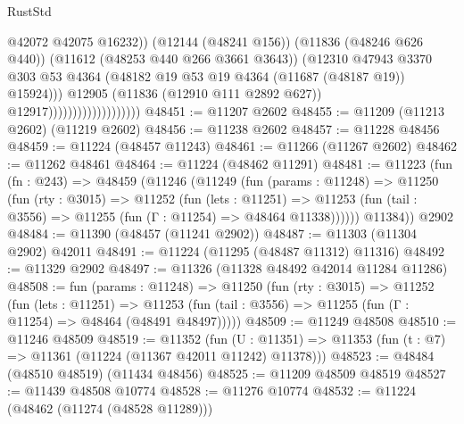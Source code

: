 \begin{lexlean}{RustStd}
\begin{coremodule}
                                                @42072
                                                @42075
                                                @16232))
                                            (@12144 (@48241 @156))
                                            (@11836 (@48246 @626 @440))
                                            (@11612 (@48253 @440 @266 @3661 @3643))
                                            (@12310
                                              @47943
                                              @3370
                                              @303
                                              @53
                                              @4364
                                              (@48182
                                                @19
                                                @53
                                                @19
                                                @4364
                                                (@11687 (@48187 @19))
                                                @15924)))
                                          @12905
                                          (@11836 (@12910 @111 @2892 @627))
                                          @12917)))))))))))))))))))
@48451 := @11207 @2602
@48455 := @11209 (@11213 @2602) (@11219 @2602)
@48456 := @11238 @2602
@48457 := @11228 @48456
@48459 := @11224 (@48457 @11243)
@48461 := @11266 (@11267 @2602)
@48462 := @11262 @48461
@48464 := @11224 (@48462 @11291)
@48481 := @11223
    (fun (fn : @243) =>
    @48459
      (@11246
        (@11249
          (fun (params : @11248) =>
          @11250
            (fun (rty : @3015) =>
            @11252
              (fun (lets : @11251) =>
              @11253 (fun (tail : @3556) => @11255 (fun (Γ : @11254) => @48464 @11338))))))
        @11384))
    @2902
@48484 := @11390 (@48457 (@11241 @2902))
@48487 := @11303 (@11304 @2902) @42011
@48491 := @11224 (@11295 (@48487 @11312) @11316)
@48492 := @11329 @2902
@48497 := @11326 (@11328 @48492 @42014 @11284 @11286)
@48508 := fun (params : @11248) =>
  @11250
    (fun (rty : @3015) =>
    @11252
      (fun (lets : @11251) =>
      @11253 (fun (tail : @3556) => @11255 (fun (Γ : @11254) => @48464 (@48491 @48497)))))
@48509 := @11249 @48508
@48510 := @11246 @48509
@48519 := @11352
    (fun (U : @11351) => @11353 (fun (t : @7) => @11361 (@11224 (@11367 @42011 @11242) @11378)))
@48523 := @48484 (@48510 @48519) (@11434 @48456)
@48525 := @11209 @48509 @48519
@48527 := @11439 @48508 @10774
@48528 := @11276 @10774
@48532 := @11224 (@48462 (@11274 (@48528 @11289)))

\end{coremodule}
\end{lexlean}
